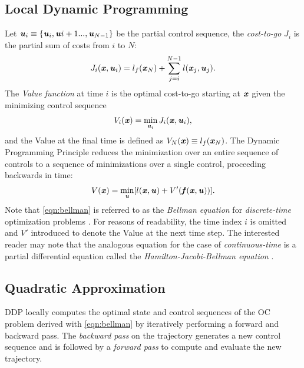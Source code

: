\subsection{Local Dynamic Programming}
Let $\bm{\mathit{u}}_i\equiv\{\bm{\mathit{u}}_i,\bm{\mathit{u}}{i+1}...,\bm{\mathit{u}}_{N-1}\}$ be the partial control sequence, the \textit{cost-to-go} $J_i$ is the partial sum of costs from $i$ to $N$: 
\begin{equation}\label{eqn:costToGo}
J_i(\bm{\mathit{x}}, \bm{\mathit{u}}_i)=l_f(\bm{\mathit{x}}_N)+\sum_{j=i}^{N-1}l(\bm{\mathit{x}}_j,\bm{\mathit{u}}_j).
\end{equation}
The \textit{Value function} at time $i$ is the optimal cost-to-go starting at $\bm{\mathit{x}}$ given the minimizing control sequence 
\begin{equation*}\label{eqn:value}
V_i(\bm{\mathit{x}})=\min_{\bm{\mathit{u}}_i}J_i(\bm{\mathit{x}}, \bm{\mathit{u}}_i),
\end{equation*}
and the Value at the final time is defined as $V_N(\bm{\mathit{x}})\equiv l_f(\bm{\mathit{x}}_N)$. The Dynamic Programming Principle \citep{bellman1966dynamic} reduces the minimization over an entire sequence of controls to a sequence of minimizations over a single control, proceeding backwards in time: 
\begin{equation}\label{eqn:bellman}
V(\bm{\mathit{x}})=\min_{\bm{\mathit{u}}}[l(\bm{\mathit{x}}, \bm{\mathit{u}})+V'(\bm{\mathit{f}}(\bm{\mathit{x}},\bm{\mathit{u}}))].
\end{equation}
Note that \cref{eqn:bellman} is referred to as the \textit{Bellman equation} for \textit{discrete-time} optimization problems \citep{kirk2004optimal}. For reasons of readability, the time index $i$ is omitted and $V'$ introduced to denote the Value at the next time step. The interested reader may note that the analogous equation for the case of \textit{continuous-time} is a partial differential equation called the \textit{Hamilton-Jacobi-Bellman equation} \citep{underactuatedCourse2020, kamien2012dynamic}.

\subsection{Quadratic Approximation}
\gls{DDP} locally computes the optimal state and control sequences of the \gls{OC} problem derived with \cref{eqn:bellman} by iteratively performing a forward and backward pass. The \textit{backward pass} on the trajectory generates a new control sequence and is followed by a \textit{forward pass} to compute and evaluate the new trajectory.

